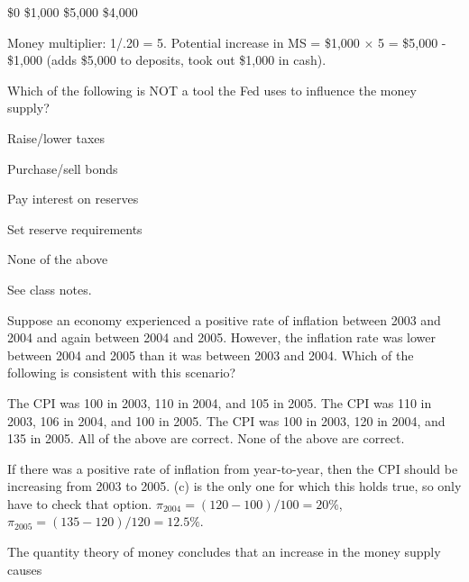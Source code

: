 \documentclass[addpoints,11pt]{exam}
\theoremstyle{definition}
\begin{document}
\begin{questions}
	\begin{choices}
		\choice \$0
		\choice \$1,000
		\choice \$5,000
		\CorrectChoice \$4,000
	\end{choices}
	
	\begin{solution} 
		Money multiplier: 1/.20 = 5. Potential increase in MS = \$1,000 $\times$ 5 = \$5,000 - \$1,000 (adds \$5,000 to deposits, took out \$1,000 in cash).
	\end{solution}
		


\question Which of the following is NOT a tool the Fed uses to influence the money supply?

\begin{choices}
	\CorrectChoice Raise/lower taxes
	\item Purchase/sell bonds
	\item Pay interest on reserves
	\item Set reserve requirements
	\item None of the above
\end{choices}

\begin{solution} 
	See class notes.	
\end{solution}	

		
\question Suppose an economy experienced a positive rate of inflation between 2003 and 2004 and again between 2004 and 2005. However, the inflation rate was lower between 2004 and 2005 than it was between 2003 and 2004. Which of the following is consistent with this scenario?
	
	\begin{choices}
		\choice The CPI was 100 in 2003, 110 in 2004, and 105 in 2005.
		\choice The CPI was 110 in 2003, 106 in 2004, and 100 in 2005.
		\CorrectChoice The CPI was 100 in 2003, 120 in 2004, and 135 in 2005.
		\choice All of the above are correct.
		\choice None of the above are correct.
	\end{choices}
	
\begin{solution} 
	If there was a positive rate of inflation from year-to-year, then the CPI should be increasing from 2003 to 2005. (c) is the only one for which this holds true, so only have to check that option. $\pi_{2004} = (120-100)/100 = 20\%$, $\pi_{2005} = (135-120)/120 = 12.5\%$.
\end{solution}


\question The quantity theory of money concludes that an increase in the money supply causes


\end{questions}
\end{document}
